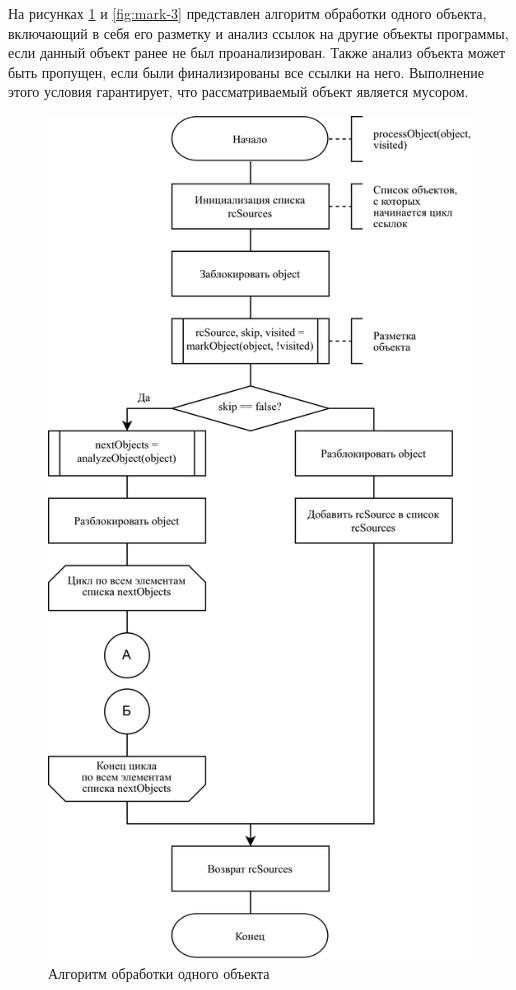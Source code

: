 На рисунках \ref{fig:mark-2} и \ref{fig:mark-3} представлен алгоритм обработки одного объекта, включающий в себя его разметку и анализ ссылок на другие объекты программы, если данный объект ранее не был проанализирован. Также анализ объекта может быть пропущен, если были финализированы все ссылки на него. Выполнение этого условия гарантирует, что рассматриваемый объект является мусором.

\begin{figure}[H]
	\centering
	\includegraphics[scale=0.185]{assets/mark-2.png}
	\caption{Алгоритм обработки одного объекта}
	\label{fig:mark-2}
\end{figure}

